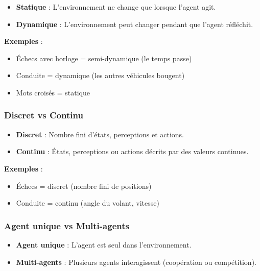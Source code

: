 \documentclass[11pt,a4paper]{article}
\begin{document}
\begin{definitionbox}
\begin{itemize}
    \item \textbf{Statique} : L'environnement ne change que lorsque l'agent agit.
    \item \textbf{Dynamique} : L'environnement peut changer pendant que l'agent réfléchit.
\end{itemize}
\end{definitionbox}

\textbf{Exemples} :
\begin{itemize}
    \item Échecs avec horloge = semi-dynamique (le temps passe)
    \item Conduite = dynamique (les autres véhicules bougent)
    \item Mots croisés = statique
\end{itemize}

\subsubsection{Discret vs Continu}

\begin{definitionbox}
\begin{itemize}
    \item \textbf{Discret} : Nombre fini d'états, perceptions et actions.
    \item \textbf{Continu} : États, perceptions ou actions décrits par des valeurs continues.
\end{itemize}
\end{definitionbox}

\textbf{Exemples} :
\begin{itemize}
    \item Échecs = discret (nombre fini de positions)
    \item Conduite = continu (angle du volant, vitesse)
\end{itemize}

\subsubsection{Agent unique vs Multi-agents}

\begin{definitionbox}
\begin{itemize}
    \item \textbf{Agent unique} : L'agent est seul dans l'environnement.
    \item \textbf{Multi-agents} : Plusieurs agents interagissent (coopération ou compétition).
\end{itemize}
\end{definitionbox}
\end{document}
